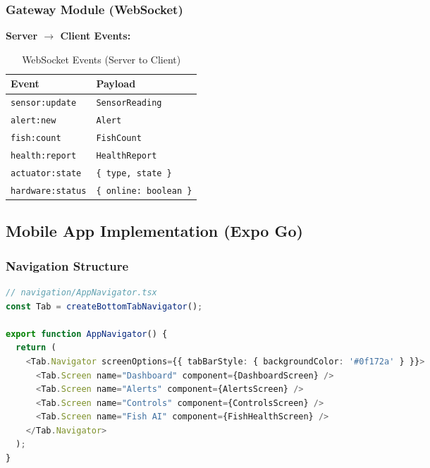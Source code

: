 \documentclass[12pt,a4paper,oneside]{article}
\begin{document}
\subsubsection{Gateway Module (WebSocket)}
\textbf{Server $\rightarrow$ Client Events:}
\begin{table}[H]
    \centering
    \begin{tabularx}{\textwidth}{ll}
        \toprule
        \textbf{Event} & \textbf{Payload} \\
        \midrule
        \texttt{sensor:update} & \texttt{SensorReading} \\
        \texttt{alert:new} & \texttt{Alert} \\
        \texttt{fish:count} & \texttt{FishCount} \\
        \texttt{health:report} & \texttt{HealthReport} \\
        \texttt{actuator:state} & \texttt{\{ type, state \}} \\
        \texttt{hardware:status} & \texttt{\{ online: boolean \}} \\
        \bottomrule
    \end{tabularx}
    \caption{WebSocket Events (Server to Client)}
\end{table}

\subsection{Mobile App Implementation (Expo Go)}

\subsubsection{Navigation Structure}
\begin{lstlisting}[language=TypeScript]
// navigation/AppNavigator.tsx
const Tab = createBottomTabNavigator();

export function AppNavigator() {
  return (
    <Tab.Navigator screenOptions={{ tabBarStyle: { backgroundColor: '#0f172a' } }}>
      <Tab.Screen name="Dashboard" component={DashboardScreen} />
      <Tab.Screen name="Alerts" component={AlertsScreen} />
      <Tab.Screen name="Controls" component={ControlsScreen} />
      <Tab.Screen name="Fish AI" component={FishHealthScreen} />
    </Tab.Navigator>
  );
}
\end{lstlisting}
\end{document}
